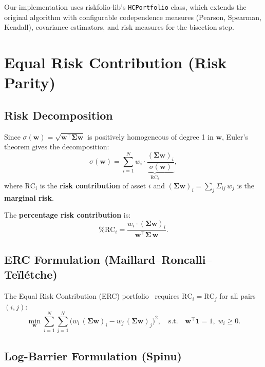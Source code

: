 \documentclass[12pt,a4paper]{article}
\begin{document}
Our implementation uses riskfolio-lib's \texttt{HCPortfolio} class, which extends the original algorithm with configurable codependence measures (Pearson, Spearman, Kendall), covariance estimators, and risk measures for the bisection step.

\section{Equal Risk Contribution (Risk Parity)}
\label{sec:risk-parity}

\subsection{Risk Decomposition}

Since $\sigma(\bm{w}) = \sqrt{\bm{w}^\top\bm{\Sigma}\bm{w}}$ is positively homogeneous of degree 1 in $\bm{w}$, Euler's theorem gives the decomposition:
\begin{equation}
    \sigma(\bm{w}) = \sum_{i=1}^{N} \underbrace{w_i \cdot \frac{(\bm{\Sigma w})_i}{\sigma(\bm{w})}}_{\text{RC}_i},
    \label{eq:euler}
\end{equation}
where $\text{RC}_i$ is the \textbf{risk contribution} of asset $i$ and $(\bm{\Sigma w})_i = \sum_j \Sigma_{ij}\,w_j$ is the \textbf{marginal risk}.

The \textbf{percentage risk contribution} is:
\begin{equation}
    \%\text{RC}_i = \frac{w_i \cdot (\bm{\Sigma w})_i}{\bm{w}^\top \bm{\Sigma}\, \bm{w}}.
    \label{eq:prc}
\end{equation}

\subsection{ERC Formulation (Maillard--Roncalli--Te\"il\'etche)}

The Equal Risk Contribution (ERC) portfolio~\cite{maillard2010} requires $\text{RC}_i = \text{RC}_j$ for all pairs $(i,j)$:
\begin{equation}
    \min_{\bm{w}} \sum_{i=1}^{N} \sum_{j=1}^{N}
        \bigl(w_i\,(\bm{\Sigma w})_i - w_j\,(\bm{\Sigma w})_j\bigr)^2,
    \quad \text{s.t.}\quad \bm{w}^\top\bm{1} = 1,\; w_i \geq 0.
    \label{eq:erc-mrt}
\end{equation}

\subsection{Log-Barrier Formulation (Spinu)}
\end{document}
